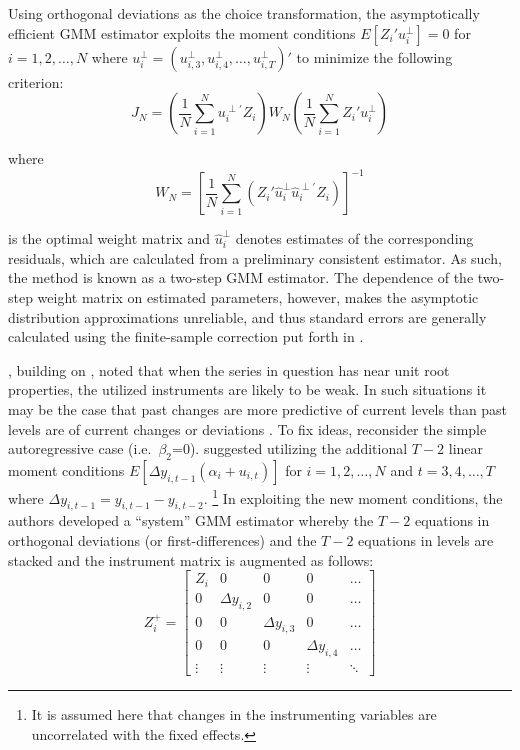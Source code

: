 \documentclass[english]{article}
\begin{document}
Using orthogonal deviations as the choice transformation, the asymptotically 
efficient GMM estimator exploits the moment conditions 
$E[Z_i' u_i^\perp]=0$ for $i=1,2,\ldots,N$ where $u_i^\perp=
(u_{i,3}^\perp, u_{i,4}^\perp, \ldots , u_{i,T}^\perp)'$ to minimize the 
following criterion:
\begin{equation}
J_N = \left(\frac{1}{N} \sum_{i=1}^N u_{i}^{\perp \prime} Z_i \right) 
W_N \left(\frac{1}{N} \sum _{i=1}^N Z_i' u_i^\perp \right)
\end{equation}

\noindent
where
\begin{equation}
W_N = \left[\frac{1}{N}\sum_{i=1}^N \left(Z_i' \widehat{u}_i^\perp 
\widehat{u}_i^{\perp \prime} Z_i \right)  \right]^{-1}
\end{equation}

\noindent
is the optimal weight matrix and $\widehat{u}_i^\perp$ denotes estimates of 
the corresponding residuals, which are calculated from a preliminary consistent 
estimator. 
As such, the method is known as a two-step GMM estimator. 
The dependence of the two-step weight matrix on estimated parameters, 
however, makes the asymptotic distribution approximations unreliable, and 
thus standard errors are generally calculated using the finite-sample correction 
put forth in \citet{windmeijer2005} 
\citep{arellano1991, bond2002, roodman2009}.

\citet{blundell1998}, building on \citet{arellano1995}, noted that when the 
series in question has near unit root properties, the utilized instruments are 
likely to be weak.
In such situations it may be the case that past changes are more predictive of 
current levels than past levels are of current changes or deviations 
\citep{roodman2009}. 
To fix ideas, reconsider the simple autoregressive case (i.e.\ $\beta_2$=0). 
\citeauthor{blundell1998} suggested utilizing the additional $T-2$ linear 
moment conditions $E[\Delta y_{i,t-1} (\alpha_i + u_{i,t})]$ for 
$i=1,2,\ldots,N$ and $t=3,4,\ldots,T$ where $\Delta y_{i,t-1} = y_{i,t-1} - 
y_{i,t-2}$.%
\footnote{It is assumed here that changes in the instrumenting variables are 
uncorrelated with the fixed effects.}
In exploiting the new moment conditions, the authors developed a ``system'' 
GMM estimator whereby the $T-2$ equations in orthogonal deviations 
(or first-differences) and the $T-2$ equations in levels are stacked and the 
instrument matrix is augmented as follows:
\begin{equation}
Z_{i}^{+} = \left[ 
\begin{array}{ccccccc}
Z_i  & 0 & 0 & 0 & \ldots \\
0 & \Delta y_{i,2} & 0 & 0 & \ldots \\
0 & 0 & \Delta y_{i,3} & 0 & \ldots  \\
0 & 0 & 0 & \Delta y_{i,4} & \ldots  \\
\vdots & \vdots & \vdots & \vdots & \ddots
\end{array}
\right]
\label{znew}
\end{equation}
\end{document}
